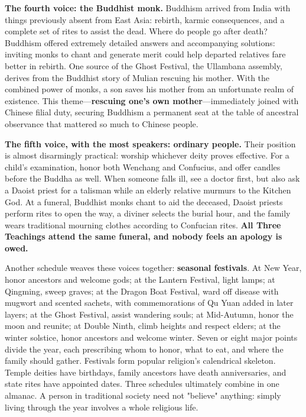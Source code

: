 \textbf{The fourth voice: the Buddhist monk.} Buddhism arrived from India with things previously absent from East Asia: rebirth, karmic consequences, and a complete set of rites to assist the dead. Where do people go after death? Buddhism offered extremely detailed answers and accompanying solutions: inviting monks to chant and generate merit could help departed relatives fare better in rebirth. One source of the Ghost Festival, the Ullambana assembly, derives from the Buddhist story of Mulian rescuing his mother. With the combined power of monks, a son saves his mother from an unfortunate realm of existence. This theme---\textbf{rescuing one's own mother}---immediately joined with Chinese filial duty, securing Buddhism a permanent seat at the table of ancestral observance that mattered so much to Chinese people.

\textbf{The fifth voice, with the most speakers: ordinary people.} Their position is almost disarmingly practical: worship whichever deity proves effective. For a child's examination, honor both Wenchang and Confucius, and offer candles before the Buddha as well. When someone falls ill, see a doctor first, but also ask a Daoist priest for a talisman while an elderly relative murmurs to the Kitchen God. At a funeral, Buddhist monks chant to aid the deceased, Daoist priests perform rites to open the way, a diviner selects the burial hour, and the family wears traditional mourning clothes according to Confucian rites. \textbf{All Three Teachings attend the same funeral, and nobody feels an apology is owed.}

Another schedule weaves these voices together: \textbf{seasonal festivals}. At New Year, honor ancestors and welcome gods; at the Lantern Festival, light lamps; at Qingming, sweep graves; at the Dragon Boat Festival, ward off disease with mugwort and scented sachets, with commemorations of Qu Yuan added in later layers; at the Ghost Festival, assist wandering souls; at Mid-Autumn, honor the moon and reunite; at Double Ninth, climb heights and respect elders; at the winter solstice, honor ancestors and welcome winter. Seven or eight major points divide the year, each prescribing whom to honor, what to eat, and where the family should gather. Festivals form popular religion's calendrical skeleton. Temple deities have birthdays, family ancestors have death anniversaries, and state rites have appointed dates. Three schedules ultimately combine in one almanac. A person in traditional society need not "believe" anything: simply living through the year involves a whole religious life.

